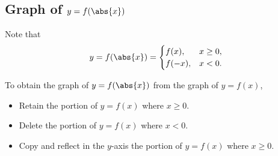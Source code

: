 \subsection{Graph of \texorpdfstring{$y = f(\abs{x})$}{y = f(|x|)}}

Note that \[y = f(\abs{x}) = \begin{cases}
    f(x), & x \geq 0,\\
    f(-x), & x < 0.
\end{cases}\]

\begin{recipe}[Graph of $y = f(\abs{x})$]
    To obtain the graph of $y = f(\abs{x})$ from the graph of $y = f(x)$,
    \begin{itemize}
        \item Retain the portion of $y = f(x)$ where $x \geq 0$.
        \item Delete the portion of $y = f(x)$ where $x < 0$.
        \item Copy and reflect in the $y$-axis the portion of $y = f(x)$ where $x \geq 0$.
    \end{itemize}
\end{recipe}

